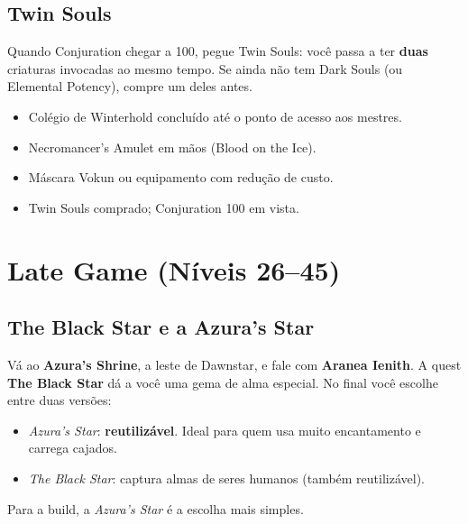 \documentclass[11pt,a4paper,oneside,openany]{book}
\newcommand{\quest}[1]{\textsf{\textbf{\textcolor{NecroEmerald}{#1}}}}
\newcommand{\lugar}[1]{\textbf{\textcolor{ImperialGold!75!black}{#1}}}
\newcommand{\npc}[1]{\textbf{#1}}
\newcommand{\objeto}[1]{\textit{\textcolor{NecroEmerald}{#1}}}
\newcommand{\perk}[1]{\textsf{\textcolor{SoulCairnPurple}{#1}}}
\begin{document}
\section{Twin Souls}
Quando Conjuration chegar a 100, pegue \perk{Twin Souls}: você passa a ter \textbf{duas} criaturas invocadas ao mesmo tempo. Se ainda não tem \perk{Dark Souls} (ou \perk{Elemental Potency}), compre um deles antes.

\begin{checkpoint}
\begin{itemize}
  \item Colégio de Winterhold concluído até o ponto de acesso aos mestres.
  \item Necromancer's Amulet em mãos (Blood on the Ice).
  \item Máscara Vokun ou equipamento com redução de custo.
  \item \perk{Twin Souls} comprado; Conjuration 100 em vista.
\end{itemize}
\end{checkpoint}

\chapter{Late Game (Níveis 26--45)}

\section{The Black Star e a Azura's Star}
Vá ao \lugar{Azura's Shrine}, a leste de Dawnstar, e fale com \npc{Aranea Ienith}. A quest \quest{The Black Star} dá a você uma gema de alma especial. No final você escolhe entre duas versões:
\begin{itemize}
  \item \objeto{Azura's Star}: \textbf{reutilizável}. Ideal para quem usa muito encantamento e carrega cajados.
  \item \objeto{The Black Star}: captura almas de seres humanos (também reutilizável).
\end{itemize}
Para a build, a \emph{Azura's Star} é a escolha mais simples.
\end{document}
